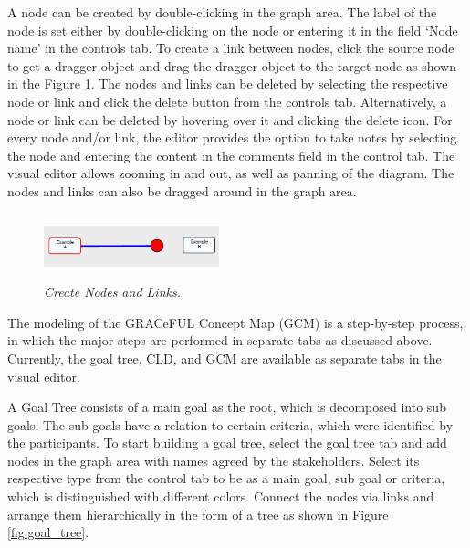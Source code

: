 \documentclass[a4paper]{article}
\begin{document}
A node can be created by double-clicking in the graph area. The label of the node is set either by double-clicking on the node or entering it in the field ‘Node name’ in the controls tab. To create a link between nodes, click the source node to get a dragger object and drag the dragger object to the target node as shown in the Figure \ref{fig:node_link}. The nodes and links can be deleted by selecting the respective node or link and click the delete button from the controls tab. Alternatively, a node or link can be deleted by hovering over it and clicking the delete icon. For every node and/or link, the editor provides the option to take notes by selecting the node and entering the content in the comments field in the control tab. The visual editor allows zooming in and out, as well as panning of the diagram. The nodes and links can also be dragged around in the graph area. 

\begin{figure}
\begin{center}
\includegraphics[height=0.75in,width=2in]{img/node_link.png}
\caption{\small \sl Create Nodes and Links.\label{fig:node_link}}
\end{center}
\end{figure}

The modeling of the GRACeFUL Concept Map (GCM) is a step-by-step process, in which the major steps are performed in separate tabs as discussed above. Currently, the goal tree, CLD, and GCM are available as separate tabs in the visual editor. 

A Goal Tree consists of a main goal as the root, which is decomposed into sub goals. The sub goals have a relation to certain criteria, which were identified by the participants. To start building a goal tree, select the goal tree tab and add nodes in the graph area with names agreed by the stakeholders. Select its respective type from the control tab to be as a main goal, sub goal or criteria, which is distinguished with different colors. Connect the nodes via links and arrange them hierarchically in the form of a tree as shown in Figure \ref{fig:goal_tree}.
\end{document}
